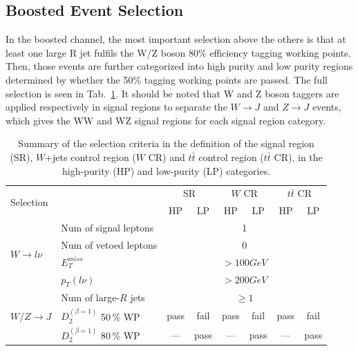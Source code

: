 \subsection{Boosted Event Selection}
In the boosted channel, the most important selection above the others is that at least one large R jet fulfils the W/Z boson $80\%$ efficiency tagging working points. Then, those events are further categorized into high purity and low purity regions determined by whether the 50$\%$ tagging working points are passed. The full selection is seen in Tab.~\ref{tab:SRdefinitions}. It should be noted that W and Z boson taggers are applied respectively in signal regions to separate the $W\to J$ and $Z\to J$ events, which gives the WW and WZ signal regions for each signal region category. 

\begin{table}[t]
	\caption{Summary of the selection criteria in the definition of the signal region (SR), $W$+jets control region ($W$ CR) and $t\bar{t}$ control region ($t\bar{t}$ CR), in the high-purity (HP) and low-purity (LP) categories.  } \label{tab:SRdefinitions}
	\begin{center}
		\begin{adjustbox}{center}
		\begin{tabular}{|l|l|c|c|c|c|c|c|}
			\hline
			\multicolumn{2}{|l|}{\multirow{2}{*}{Selection}} & \multicolumn{2}{c|}{SR}  &  \multicolumn{2}{c|}{$W$ CR}  & \multicolumn{2}{c|}{$t\bar{t}$ CR} \\
			\cline{3-8}
			\multicolumn{2}{|l|}{} & HP & LP &HP & LP & HP & LP \\
			\hline
			\multirow{4}{*}{$W\rightarrow l\nu$} & Num of signal leptons & \multicolumn{6}{c|}{ 1 } \\
			\cline{2-8}
			&Num of vetoed leptons & \multicolumn{6}{c|}{ 0 }  \\
			\cline{2-8}
			&\vphantom{\Large B} $E^{miss}_{T}$ & \multicolumn{6}{c|}{ $>100GeV$ } \\
			\cline{2-8}
			&$p_{T}(l\nu)$ & \multicolumn{6}{c|}{ $>200GeV$ } \\
			\hline
			\multirow{5}{*}{$W/Z\rightarrow J$} & Num of large-$R$ jets & \multicolumn{6}{c|}{ $\geq 1$ } \\
			\cline{2-8}
			& \vphantom{\Large B} $D^{(\beta=1)}_2$ 50\,\% WP & pass & fail & pass & fail & pass & fail \\
			\cline{2-8}
			& \vphantom{\Large B} $D^{(\beta=1)}_2$ 80\,\% WP & --- & pass  & --- & pass  & --- & pass \\

\end{tabular}
\end{adjustbox}
\end{center}
\end{table}

